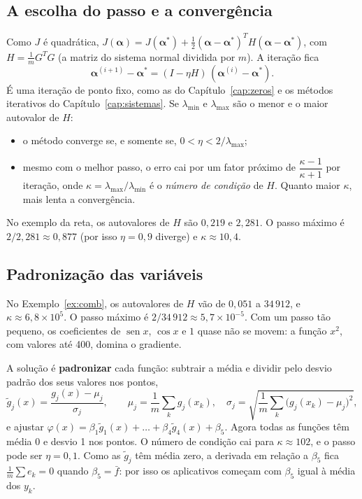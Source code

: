 \subsection{A escolha do passo e a convergência}

Como $J$ é quadrática, $J(\boldsymbol\alpha)=J(\boldsymbol\alpha^*)+\tfrac12(\boldsymbol\alpha-\boldsymbol\alpha^*)^TH(\boldsymbol\alpha-\boldsymbol\alpha^*)$,
com $H=\frac1mG^TG$ (a matriz do sistema normal dividida por $m$). A iteração fica
\[
\boldsymbol\alpha^{(i+1)}-\boldsymbol\alpha^*=(I-\eta H)\,(\boldsymbol\alpha^{(i)}-\boldsymbol\alpha^*).
\]
É uma iteração de ponto fixo, como as do Capítulo~\ref{cap:zeros} e os métodos iterativos do
Capítulo~\ref{cap:sistemas}. Se $\lambda_{\min}$ e $\lambda_{\max}$ são o menor e o maior autovalor de $H$:
\begin{itemize}[nosep]
  \item o método converge se, e somente se, $0<\eta<2/\lambda_{\max}$;
  \item mesmo com o melhor passo, o erro cai por um fator próximo de
        $\dfrac{\kappa-1}{\kappa+1}$ por iteração, onde $\kappa=\lambda_{\max}/\lambda_{\min}$ é o
        \emph{número de condição} de $H$. Quanto maior $\kappa$, mais lenta a convergência.
\end{itemize}

No exemplo da reta, os autovalores de $H$ são $0{,}219$ e $2{,}281$. O passo máximo é
$2/2{,}281\approx0{,}877$ (por isso $\eta=0{,}9$ diverge) e $\kappa\approx10{,}4$.

\subsection{Padronização das variáveis}

No Exemplo~\ref{ex:comb}, os autovalores de $H$ vão de $0{,}051$ a $34\,912$, e $\kappa\approx6{,}8\times10^{5}$.
O passo máximo é $2/34\,912\approx5{,}7\times10^{-5}$. Com um passo tão pequeno, os coeficientes de
$\operatorname{sen}x$, $\cos x$ e $1$ quase não se movem: a função $x^2$, com valores até 400, domina o gradiente.

A solução é \textbf{padronizar} cada função: subtrair a média e dividir pelo desvio padrão dos seus valores nos pontos,
\[
\tilde g_j(x)=\frac{g_j(x)-\mu_j}{\sigma_j},\qquad
\mu_j=\frac1m\sum_kg_j(x_k),\quad \sigma_j=\sqrt{\frac1m\sum_k\big(g_j(x_k)-\mu_j\big)^2},
\]
e ajustar $\varphi(x)=\beta_1\tilde g_1(x)+\dots+\beta_4\tilde g_4(x)+\beta_5$. Agora todas as funções
têm média 0 e desvio 1 nos pontos. O número de condição cai para $\kappa\approx102$, e o passo pode ser
$\eta=0{,}1$. Como as $\tilde g_j$ têm média zero, a derivada em relação a $\beta_5$ fica
$\frac1m\sum e_k=0$ quando $\beta_5=\bar f$: por isso os aplicativos começam com $\beta_5$ igual à média dos $y_k$.

